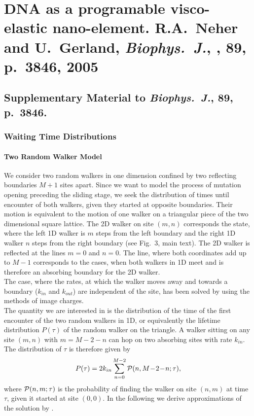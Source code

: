 \section[R.A.~Neher and U.~Gerland, \emph{Biophys.~J.}, , {\bf 89}, p.~3846]{DNA as a programable visco-elastic nano-element. R.A.~Neher and U.~Gerland, \emph{Biophys.~J.}, , {\bf 89}, p.~3846, 2005}
\label{sec:Neher_BiophysJ_05}
\clearpage
\addtocounter{page}{9}

\subsection{\label{sec:biophysj_supp}Supplementary Material to \emph{Biophys.~J.}, {\bf 89}, p.~3846.}
\subsubsection*{Waiting Time Distributions}
\paragraph*{Two Random Walker Model}
We consider two random walkers in one dimension confined by two reflecting boundaries $M\!+\!1$ sites apart. Since we want to model the process of mutation opening preceding the sliding stage, we seek the distribution of times until encounter of both walkers, given they started at opposite boundaries. Their motion is equivalent to the motion of one walker on a triangular piece of the two dimensional square lattice.  The 2D walker on site $(m,n)$ corresponds the state, where the left 1D walker is $m$ steps from the left boundary and the right 1D walker $n$ steps from the right boundary (see Fig.~3, main text).  The 2D walker is reflected at the lines $m=0$ and $n=0$. The line, where both coordinates add up to $M-1$ corresponds to the cases, when both walkers in 1D meet and is therefore an absorbing boundary for the 2D walker. \\
The case, where the rates, at which the walker moves away and towards a boundary ($k_{in}$ and $k_{out}$) are independent of the site, has been solved by \citet{Schwarz_75} using the methods of image charges. \\ 
The quantity we are interested in is the distribution of the time of the first encounter of the two random walkers in 1D, or equivalently the lifetime distribution $P(\tau)$ of the random walker on the triangle. A walker sitting on any site $(m,n)$ with $m=M-2-n$ can hop on two absorbing sites with rate $k_{in}$. The distribution of $\tau$ is therefore given by
\begin{equation}
\label{eq:lifetime}
 P(\tau)=2k_{in}\sum_{n=0}^{M-2} {\cal P}(n,M\!-\!2\!-\!n;\tau),
\end{equation}
 where ${\cal P}(n,m;\tau)$ is the probability of finding the walker on site $(n,m)$ at time $\tau$, given it started at site $(0,0)$. In the following we derive approximations of the solution by \citeauthor{Schwarz_75}.

